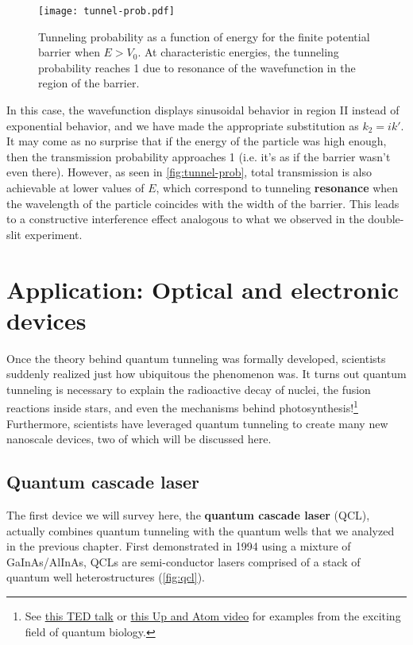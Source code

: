 \begin{figure}[!h]
	\centering
	\texttt{[image: tunnel-prob.pdf]}
	\caption{Tunneling probability as a function of energy for the finite potential barrier when $E > V_0$. 
	At characteristic energies, the tunneling probability reaches 1 due to resonance of the wavefunction in the region of the barrier.}
	\label{fig:tunnel-prob}
\end{figure}

In this case, the wavefunction displays sinusoidal behavior in region II instead of exponential behavior, and we have made the appropriate substitution as $k_2 = ik'$. 
It may come as no surprise that if the energy of the particle was high enough, then the transmission probability approaches 1 (i.e. it's as if the barrier wasn't even there). 
However, as seen in \autoref{fig:tunnel-prob}, total transmission is also achievable at lower values of $E$, which correspond to tunneling \textbf{resonance} when the wavelength of the particle coincides with the width of the barrier. 
This leads to a constructive interference effect analogous to what we observed in the double-slit experiment.


\section[Application: Devices]{Application: Optical and electronic devices}

Once the theory behind quantum tunneling was formally developed, scientists suddenly realized just how ubiquitous the phenomenon was. 
It turns out quantum tunneling is necessary to explain the radioactive decay of nuclei, the fusion reactions inside stars, and even the mechanisms behind photosynthesis!\footnote{See \href{https://www.youtube.com/watch?v=_qgSz1UmcBM}{this TED talk} or \href{https://www.youtube.com/watch?v=Zc9Xk99gCr4}{this Up and Atom video} for examples from the exciting field of quantum biology.}
Furthermore, scientists have leveraged quantum tunneling to create many new nanoscale devices, two of which will be discussed here.

\subsection{Quantum cascade laser}
The first device we will survey here, the \textbf{quantum cascade laser} (QCL), actually combines quantum tunneling with the quantum wells that we analyzed in the previous chapter. 
First demonstrated in 1994 using a mixture of GaInAs/AlInAs, QCLs are semi-conductor lasers comprised of a stack of quantum well heterostructures (\autoref{fig:qcl}).

